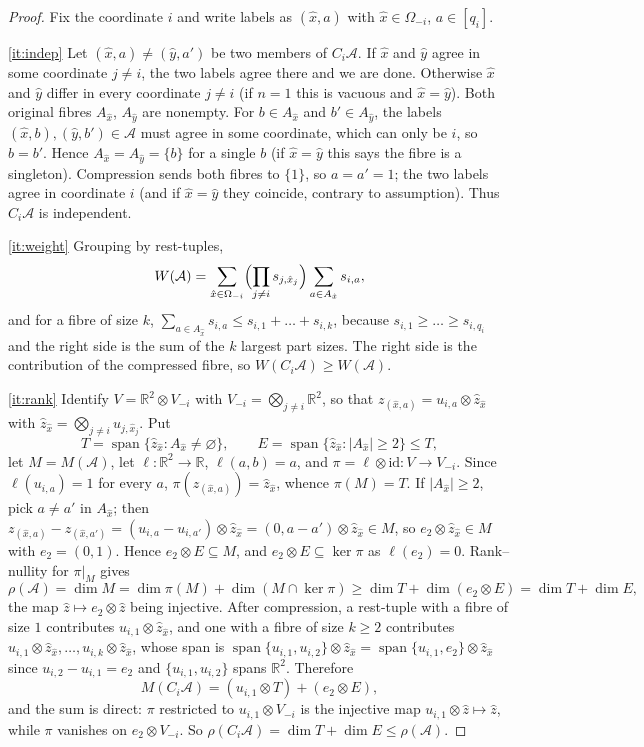 \documentclass[11pt,a4paper]{article}
\theoremstyle{plain}
\theoremstyle{definition}
\theoremstyle{remark}
\newcommand{\R}{\mathbb R}
\newcommand{\cA}{\mathcal A}
\newcommand{\Om}{\Omega}
\newcommand{\rk}{\rho}
\newcommand{\spn}{\operatorname{span}}
\begin{document}
\label{pf:compress}
\lemcompress*
\begin{proof}
Fix the coordinate $i$ and write labels as $(\hat x,a)$ with $\hat x\in\Om_{-i}$, $a\in[q_i]$.

\ref{it:indep} Let $(\hat x,a)\ne(\hat y,a')$ be two members of $C_i\cA$. If $\hat x$ and $\hat y$ agree in some coordinate $j\ne i$, the two labels agree there and we are done. Otherwise $\hat x$ and $\hat y$ differ in every coordinate $j\ne i$ (if $n=1$ this is vacuous and $\hat x=\hat y$). Both original fibres $A_{\hat x}$, $A_{\hat y}$ are nonempty. For $b\in A_{\hat x}$ and $b'\in A_{\hat y}$, the labels $(\hat x,b),(\hat y,b')\in\cA$ must agree in some coordinate, which can only be $i$, so $b=b'$. Hence $A_{\hat x}=A_{\hat y}=\{b\}$ for a single $b$ (if $\hat x=\hat y$ this says the fibre is a singleton). Compression sends both fibres to $\{1\}$, so $a=a'=1$; the two labels agree in coordinate $i$ (and if $\hat x=\hat y$ they coincide, contrary to assumption). Thus $C_i\cA$ is independent.

\ref{it:weight} Grouping by rest-tuples,
\[
W(\cA)=\sum_{\hat x\in\Om_{-i}}\Bigl(\prod_{j\ne i}s_{j,\hat x_j}\Bigr)\sum_{a\in A_{\hat x}}s_{i,a},
\]
and for a fibre of size $k$, $\sum_{a\in A_{\hat x}}s_{i,a}\le s_{i,1}+\dots+s_{i,k}$, because $s_{i,1}\ge\dots\ge s_{i,q_i}$ and the right side is the sum of the $k$ largest part sizes. The right side is the contribution of the compressed fibre, so $W(C_i\cA)\ge W(\cA)$.

\ref{it:rank} Identify $V=\R^2\otimes V_{-i}$ with $V_{-i}=\bigotimes_{j\ne i}\R^2$, so that $z_{(\hat x,a)}=u_{i,a}\otimes\hat z_{\hat x}$ with $\hat z_{\hat x}=\bigotimes_{j\ne i}u_{j,\hat x_j}$. Put
\[
T=\spn\{\hat z_{\hat x}:A_{\hat x}\ne\varnothing\},\qquad E=\spn\{\hat z_{\hat x}:|A_{\hat x}|\ge2\}\le T,
\]
let $M=M(\cA)$, let $\ell:\R^2\to\R$, $\ell(a,b)=a$, and $\pi=\ell\otimes\mathrm{id}:V\to V_{-i}$. Since $\ell(u_{i,a})=1$ for every $a$, $\pi(z_{(\hat x,a)})=\hat z_{\hat x}$, whence $\pi(M)=T$. If $|A_{\hat x}|\ge2$, pick $a\ne a'$ in $A_{\hat x}$; then $z_{(\hat x,a)}-z_{(\hat x,a')}=(u_{i,a}-u_{i,a'})\otimes\hat z_{\hat x}=(0,a-a')\otimes\hat z_{\hat x}\in M$, so $e_2\otimes\hat z_{\hat x}\in M$ with $e_2=(0,1)$. Hence $e_2\otimes E\subseteq M$, and $e_2\otimes E\subseteq\ker\pi$ as $\ell(e_2)=0$. Rank--nullity for $\pi|_M$ gives
\[
\rk(\cA)=\dim M=\dim\pi(M)+\dim(M\cap\ker\pi)\ge\dim T+\dim(e_2\otimes E)=\dim T+\dim E,
\]
the map $\hat z\mapsto e_2\otimes\hat z$ being injective. After compression, a rest-tuple with a fibre of size $1$ contributes $u_{i,1}\otimes\hat z_{\hat x}$, and one with a fibre of size $k\ge2$ contributes $u_{i,1}\otimes\hat z_{\hat x},\dots,u_{i,k}\otimes\hat z_{\hat x}$, whose span is $\spn\{u_{i,1},u_{i,2}\}\otimes\hat z_{\hat x}=\spn\{u_{i,1},e_2\}\otimes\hat z_{\hat x}$ since $u_{i,2}-u_{i,1}=e_2$ and $\{u_{i,1},u_{i,2}\}$ spans $\R^2$. Therefore
\[
M(C_i\cA)=(u_{i,1}\otimes T)+(e_2\otimes E),
\]
and the sum is direct: $\pi$ restricted to $u_{i,1}\otimes V_{-i}$ is the injective map $u_{i,1}\otimes\hat z\mapsto\hat z$, while $\pi$ vanishes on $e_2\otimes V_{-i}$. So $\rk(C_i\cA)=\dim T+\dim E\le\rk(\cA)$.


\end{proof}
\end{document}
